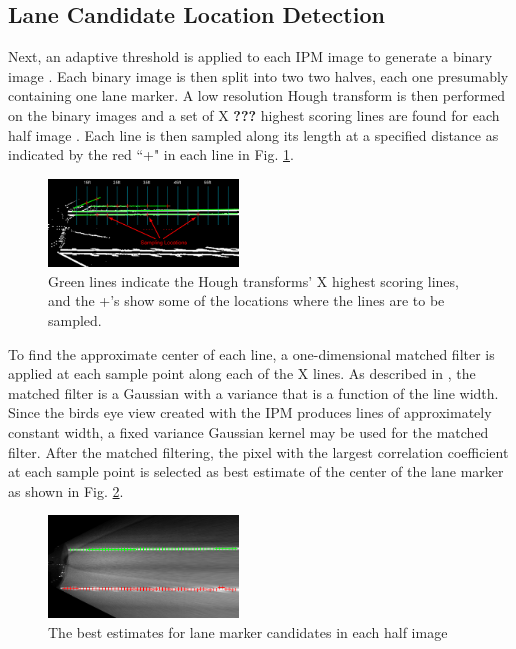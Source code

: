 \documentclass{article}
\begin{document}
\subsection{Lane Candidate Location Detection}
Next, an adaptive threshold is applied to each IPM image to generate a binary image \cite{borkar_layered_2009}.  Each binary image is then split into two two halves, each one presumably containing one lane marker.
A low resolution Hough transform is then performed on the binary images and a set of X {\bf ???} highest scoring lines are found for each half image \cite{borkar_layered_2009}. Each line is then sampled along its length at a specified distance as indicated by the red ``+" in each line in Fig. \ref{fig:sampling_points}.
\begin{figure}[htb]
  \centering
  \includegraphics[width=0.45\textwidth]{IMG/cand_lane_points.png}
  \caption{Green lines indicate the Hough transforms' X highest scoring lines, and the
    +'s show some of the locations where the lines are to be sampled.}
  \label{fig:sampling_points}
\end{figure}
To find the approximate center of each line, a one-dimensional matched filter is applied at each sample point along each of the X lines.
As described in \cite{borkar_layered_2009}, the matched filter is a Gaussian with a variance that is a function of the line width.
Since the birds eye view created with the IPM produces lines of approximately constant width, a fixed variance Gaussian kernel may be used for the matched filter.
After the matched filtering, the pixel with the largest correlation coefficient at each sample point is selected as best estimate of the center of the lane marker as shown in Fig. \ref{fig:cand_pts}.
\begin{figure}[htb]
  \centering
  \includegraphics[width=0.45\textwidth]{IMG/cand_lane_points2.png}
  \caption{The best estimates for lane marker candidates in each half image}
  \label{fig:cand_pts}
\end{figure}
\end{document}
